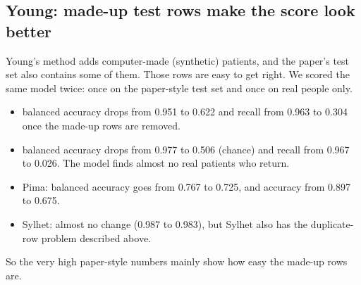 \documentclass[11pt,a4paper]{article}
\begin{document}
\subsection{Young: made-up test rows make the score look better}
Young's method adds computer-made (synthetic) patients, and the paper's test set also contains some of them. Those rows are easy to get right. We scored the same model twice: once on the paper-style test set and once on real people only.
\begin{table}[H]\centering\small\caption{Young's QISICGM ensemble. Left: paper-style test set that includes made-up rows. Right: real rows only. Mean over 5 folds (seed 42), from \texttt{02\_young.csv}.}
\end{table}
\begin{itemize}[leftmargin=1.5em]
\item {} balanced accuracy drops from 0.951 to 0.622 and recall from 0.963 to 0.304 once the made-up rows are removed.
\item {} balanced accuracy drops from 0.977 to 0.506 (chance) and recall from 0.967 to 0.026. The model finds almost no real patients who return.
\item Pima: balanced accuracy goes from 0.767 to 0.725, and accuracy from 0.897 to 0.675.
\item Sylhet: almost no change (0.987 to 0.983), but Sylhet also has the duplicate-row problem described above.
\end{itemize}
So the very high paper-style numbers mainly show how easy the made-up rows are.
\end{document}
